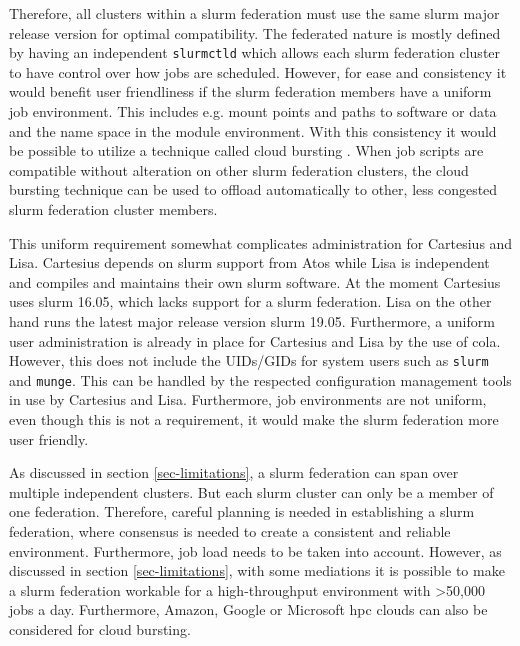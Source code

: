 \documentclass[conference]{IEEEtran}
\begin{document}
Therefore, all clusters within a \gls{slurm} federation must use the same \gls{slurm} major release version for optimal compatibility. The federated nature is mostly defined by having an independent \texttt{slurmctld} which allows each \gls{slurm} federation cluster to have control over how jobs are scheduled. However, for ease and consistency it would benefit user friendliness if the \gls{slurm} federation members have a uniform job environment. This includes e.g. mount points and paths to software or data and the name space in the module environment. With this consistency it would be possible to utilize a technique called cloud bursting \cite{slurm-cloud-bursting}. When job scripts are compatible without alteration on other \gls{slurm} federation clusters, the cloud bursting technique can be used to offload automatically to other, less congested \gls{slurm} federation cluster members.

This uniform requirement somewhat complicates administration for Cartesius and Lisa. Cartesius depends on \gls{slurm} support from Atos \cite{atos-website} while Lisa is independent and compiles and maintains their own \gls{slurm} software. At the moment Cartesius uses \gls{slurm} 16.05, which lacks support for a \gls{slurm} federation. Lisa on the other hand runs the latest major release version \gls{slurm} 19.05. Furthermore, a uniform user administration is already in place for Cartesius and Lisa by the use of \gls{cola}. However, this does not include the UIDs/GIDs for system users such as \texttt{slurm} and \texttt{munge}. This can be handled by the respected configuration management tools in use by Cartesius and Lisa. Furthermore, job environments are not uniform, even though this is not a requirement, it would make the \gls{slurm} federation more user friendly.

As discussed in section \ref{sec-limitations}, a \gls{slurm} federation can span over multiple independent clusters. But each \gls{slurm} cluster can only be a member of one federation. Therefore, careful planning is needed in establishing a \gls{slurm} federation, where consensus is needed to create a consistent and reliable environment. Furthermore, job load needs to be taken into account. However, as discussed in section \ref{sec-limitations}, with some mediations it is possible to make a \gls{slurm} federation workable for a high-throughput environment with \textgreater 50,000 jobs a day. Furthermore, Amazon, Google or Microsoft \gls{hpc} clouds can also be considered for cloud bursting.






\end{document}
